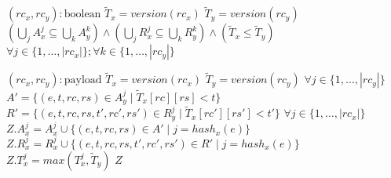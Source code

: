 \begin{algorithm}[h!]
{\begin{algorithmic}[1]
 	  \State \Compare $(rc_{x}, rc_{y}) : \text{boolean}$
 	  \State \hspace{\algorithmicindent} \Let $\tilde{T}_{x} = version(rc_{x})$
 	  \State \hspace{\algorithmicindent} \Let $\tilde{T}_{y} = version(rc_{y})$
 	  \State \hspace{\algorithmicindent} \Return $(\bigcup_{j} A_{x}^{j} \subseteq \bigcup_{k} A_{y}^{k}) \land (\bigcup_{j} R_{x}^{j} \subseteq \bigcup_{k} R_{y}^{k}) \land (\tilde{T}_{x} \leq \tilde{T}_{y})$
 	  \State \hfill $\forall j \in \{1,\ldots,|rc_{x}|\}; \forall k \in \{1,\ldots,|rc_{y}|\}$
 	  
 	  \State \Merge $(rc_{x}, rc_{y}) : \text{payload}$
 	  \State \hspace{\algorithmicindent} \Let $\tilde{T}_{x} = version(rc_{x})$
 	  \State \hspace{\algorithmicindent} \Let $\tilde{T}_{y} = version(rc_{y})$
      \State \hspace{\algorithmicindent} $\forall j \in \{1,\ldots,|rc_{y}|\}$
      \State \hspace{\algorithmicindent} \hspace{\algorithmicindent} \Let $A' = \{(e, t, rc, rs) \in A_{y}^{j} \mid \tilde{T}_{x}[rc][rs] < t\}$
      \State \hspace{\algorithmicindent} \hspace{\algorithmicindent} \Let $R' = \{(e, t, rc, rs, t', rc', rs') \in R_{y}^{j} \mid \tilde{T}_{x}[rc'][rs'] < t'\}$
      \State \hspace{\algorithmicindent} $\forall j \in \{1,\ldots,|rc_{x}|\}$
      \State \hspace{\algorithmicindent} \hspace{\algorithmicindent} \Let $Z.A_{x}^{j} = A_{x}^{j} \cup \{(e, t, rc, rs) \in A' \mid j = hash_{x}(e)\}$
      \State \hspace{\algorithmicindent} \hspace{\algorithmicindent} \Let $Z.R_{x}^{j} = R_{x}^{j} \cup \{(e, t, rc, rs, t', rc', rs') \in R' \mid j = hash_{x}(e)\}$
      \State \hspace{\algorithmicindent} \hspace{\algorithmicindent} \Let $Z.T_{x}^{j} = max(T_{x}^{j}, \tilde{T}_{y})$
      \State \hspace{\algorithmicindent} \Return $Z$
	\end{algorithmic}
 }
\end{algorithm}


